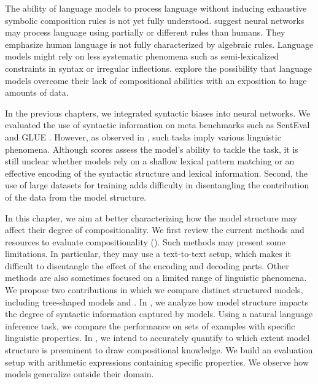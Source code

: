 The ability of language models to process language without inducing exhaustive symbolic composition rules is not yet fully understood. \textcite{baroni_19} suggest neural networks may process language using partially or different rules than humans. They emphasize human language is not fully characterized by algebraic rules. Language models might rely on less systematic phenomena such as semi-lexicalized constraints in syntax or irregular inflections. \textcite{lake_17} explore the possibility that language models overcome their lack of compositional abilities with an exposition to huge amounts of data.

In the previous chapters, we integrated syntactic biases into neural networks. We evaluated the use of syntactic information on meta benchmarks such as SentEval \parencite{conneau_18} and GLUE \parencite{wang_19}. However, as observed in \textcite{baroni_18}, such tasks imply various linguistic phenomena. Although scores assess the model's ability to tackle the task, it is still unclear whether models rely on a shallow lexical pattern matching or an effective encoding of the syntactic structure and lexical information. Second, the use of large datasets for training \parencite{bowman_15, williams_18} adds difficulty in disentangling the contribution of the data from the model structure.

In this chapter, we aim at better characterizing how the model structure may affect their degree of compositionality. We first review the current methods and resources to evaluate compositionality (). Such methods may present some limitations. In particular, they may use a text-to-text setup, which makes it difficult to disentangle the effect of the encoding and decoding parts. Other methods are also sometimes focused on a limited range of linguistic phenomena. We propose two contributions in which we compare distinct structured models, including tree-shaped models and \bert. In , we analyze how model structure impacts the degree of syntactic information captured by models. Using a natural language inference task, we compare the performance on sets of examples with specific linguistic properties. In , we intend to accurately quantify to which extent model structure is preeminent to draw compositional knowledge. We build an evaluation setup with arithmetic expressions containing specific properties. We observe how models generalize outside their domain.


